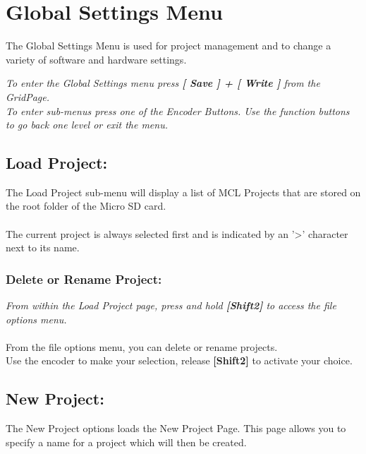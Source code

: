\chapter{Global Settings Menu}
The Global Settings Menu is used for project management and to change a variety of software and hardware settings.


\textit{To enter the Global Settings menu press \textbf{[ Save ] + [ Write ]} from the GridPage.\\
To enter sub-menus press one of the Encoder Buttons. Use the function buttons to go back one level or exit the menu.}
\section{Load Project:}
The Load Project sub-menu will display a list of MCL Projects that are stored on the root folder of the Micro SD card.\\\\
The current project is always selected first and is indicated by an '>' character next to its name.

\subsection{Delete or Rename Project:}
\textit{From within the Load Project page, press and hold \textbf{[Shift2]} to access the file options menu.}\\\\
From the file options menu, you can delete or rename projects.\\
Use the encoder to make your selection, release \textbf{[Shift2]} to activate your choice.

\newpage
\section{New Project:}
The New Project options loads the New Project Page. This page allows you to specify a name for a project which will then be created.\\

